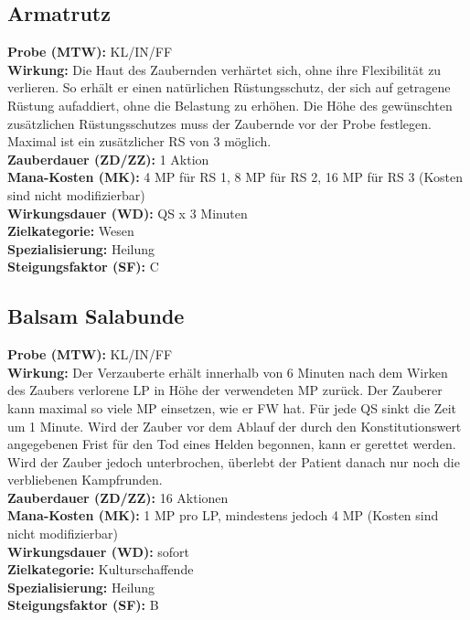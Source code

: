 \subsection{Armatrutz}
\label{chap:armatrutz}
\textbf{Probe (MTW):} KL/IN/FF \\
\textbf{Wirkung:} Die Haut des Zaubernden verhärtet sich, ohne ihre Flexibilität zu verlieren. So erhält er einen natürlichen Rüstungsschutz, der sich auf getragene Rüstung aufaddiert, ohne die Belastung zu erhöhen. Die Höhe des gewünschten zusätzlichen Rüstungsschutzes muss der Zaubernde vor der Probe festlegen. Maximal ist ein zusätzlicher RS von 3 möglich. \\
\textbf{Zauberdauer (ZD/ZZ):} 1 Aktion \\
\textbf{Mana-Kosten (MK):} 4 MP für RS 1, 8 MP für RS 2, 16 MP für RS 3 (Kosten sind nicht modifizierbar) \\
\textbf{Wirkungsdauer (WD):} QS x 3 Minuten \\
\textbf{Zielkategorie:} Wesen \\
\textbf{Spezialisierung:} Heilung \\
\textbf{Steigungsfaktor (SF):} C


\subsection{Balsam Salabunde}
\label{chap:balsam_salabunde}
\textbf{Probe (MTW):} KL/IN/FF \\
\textbf{Wirkung:} Der Verzauberte erhält innerhalb von 6 Minuten nach dem Wirken des Zaubers verlorene LP in Höhe der verwendeten MP zurück. Der Zauberer kann maximal so viele MP einsetzen, wie er FW hat. Für jede QS sinkt die Zeit um 1 Minute. Wird der Zauber vor dem Ablauf der durch den Konstitutionswert angegebenen Frist für den Tod eines Helden begonnen, kann er gerettet werden. Wird der Zauber jedoch unterbrochen, überlebt der Patient danach nur noch die verbliebenen Kampfrunden. \\
\textbf{Zauberdauer (ZD/ZZ):} 16 Aktionen \\
\textbf{Mana-Kosten (MK):} 1 MP pro LP, mindestens jedoch 4 MP (Kosten sind nicht modifizierbar) \\
\textbf{Wirkungsdauer (WD):} sofort \\
\textbf{Zielkategorie:} Kulturschaffende \\
\textbf{Spezialisierung:} Heilung \\
\textbf{Steigungsfaktor (SF):} B



